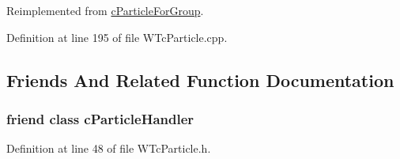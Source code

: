 Reimplemented from \hyperlink{classc_particle_for_group_a9862ab616c1588422e55ecf4ef66df23}{cParticleForGroup}.



Definition at line 195 of file WTcParticle.cpp.



\subsection{Friends And Related Function Documentation}
\hypertarget{classc_wind_and_gravity_particle_ad810bc5f0330a0154ffaabe8d256379c}{
\subsubsection[{cParticleHandler}]{\setlength{\rightskip}{0pt plus 5cm}friend class {\bf cParticleHandler}}}
\label{classc_wind_and_gravity_particle_ad810bc5f0330a0154ffaabe8d256379c}


Definition at line 48 of file WTcParticle.h.

